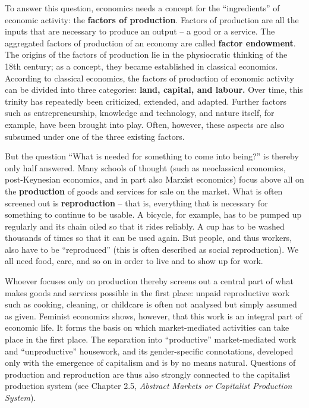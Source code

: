 \documentclass[
  british,
  a4paper,
  DIV=11,
  numbers=noendperiod,
  oneside,
  openany]{scrreprt}
\begin{document}
To answer this question, economics needs a concept for the
``ingredients'' of economic activity: the \textbf{factors of
production}. Factors of production are all the inputs that are necessary
to produce an output -- a good or a service. The aggregated factors of
production of an economy are called \textbf{factor endowment}. The
origins of the factors of production lie in the physiocratic thinking of
the 18th century; as a concept, they became established in classical
economics. According to classical economics, the factors of production
of economic activity can be divided into three categories: \textbf{land,
capital, and labour.} Over time, this trinity has repeatedly been
criticized, extended, and adapted. Further factors such as
entrepreneurship, knowledge and technology, and nature itself, for
example, have been brought into play. Often, however, these aspects are
also subsumed under one of the three existing factors.

But the question ``What is needed for something to come into being?'' is
thereby only half answered. Many schools of thought (such as
neoclassical economics, post-Keynesian economics, and in part also
Marxist economics) focus above all on the \textbf{production} of goods
and services for sale on the market. What is often screened out is
\textbf{reproduction} -- that is, everything that is necessary for
something to continue to be usable. A bicycle, for example, has to be
pumped up regularly and its chain oiled so that it rides reliably. A cup
has to be washed thousands of times so that it can be used again. But
people, and thus workers, also have to be ``reproduced'' (this is often
described as social reproduction). We all need food, care, and so on in
order to live and to show up for work.

Whoever focuses only on production thereby screens out a central part of
what makes goods and services possible in the first place: unpaid
reproductive work such as cooking, cleaning, or childcare is often not
analysed but simply assumed as given. Feminist economics shows, however,
that this work is an integral part of economic life. It forms the basis
on which market-mediated activities can take place in the first place.
The separation into ``productive'' market-mediated work and
``unproductive'' housework, and its gender-specific connotations,
developed only with the emergence of capitalism and is by no means
natural. Questions of production and reproduction are thus also strongly
connected to the capitalist production system (see Chapter 2.5,
\emph{Abstract Markets or Capitalist Production System}).
\end{document}
